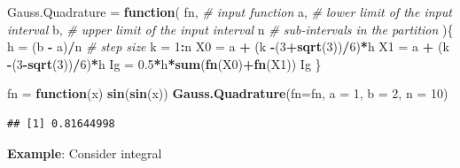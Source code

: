\documentclass[
]{book}
\newenvironment{Shaded}{\begin{snugshade}}{\end{snugshade}}
\newcommand{\AttributeTok}[1]{\textcolor[rgb]{0.13,0.29,0.53}{#1}}
\newcommand{\CommentTok}[1]{\textcolor[rgb]{0.56,0.35,0.01}{\textit{#1}}}
\newcommand{\ControlFlowTok}[1]{\textcolor[rgb]{0.13,0.29,0.53}{\textbf{#1}}}
\newcommand{\DecValTok}[1]{\textcolor[rgb]{0.00,0.00,0.81}{#1}}
\newcommand{\FloatTok}[1]{\textcolor[rgb]{0.00,0.00,0.81}{#1}}
\newcommand{\FunctionTok}[1]{\textcolor[rgb]{0.13,0.29,0.53}{\textbf{#1}}}
\newcommand{\NormalTok}[1]{#1}
\newcommand{\OtherTok}[1]{\textcolor[rgb]{0.56,0.35,0.01}{#1}}
\newcommand{\SpecialCharTok}[1]{\textcolor[rgb]{0.81,0.36,0.00}{\textbf{#1}}}
\begin{document}
\begin{Shaded}
\begin{Highlighting}[]
\NormalTok{Gauss.Quadrature }\OtherTok{=} \ControlFlowTok{function}\NormalTok{( fn,   }\CommentTok{\# input function}
\NormalTok{                             a,    }\CommentTok{\# lower limit of the input interval}
\NormalTok{                             b,    }\CommentTok{\# upper limit of the input interval}
\NormalTok{                             n     }\CommentTok{\# sub{-}intervals in the partition}
\NormalTok{                           )\{}
\NormalTok{    h }\OtherTok{=}\NormalTok{ (b }\SpecialCharTok{{-}}\NormalTok{ a)}\SpecialCharTok{/}\NormalTok{n                    }\CommentTok{\# step size}
\NormalTok{    k }\OtherTok{=} \DecValTok{1}\SpecialCharTok{:}\NormalTok{n}
\NormalTok{    X0 }\OtherTok{=}\NormalTok{ a }\SpecialCharTok{+}\NormalTok{ (k }\SpecialCharTok{{-}}\NormalTok{(}\DecValTok{3}\SpecialCharTok{+}\FunctionTok{sqrt}\NormalTok{(}\DecValTok{3}\NormalTok{))}\SpecialCharTok{/}\DecValTok{6}\NormalTok{)}\SpecialCharTok{*}\NormalTok{h}
\NormalTok{    X1 }\OtherTok{=}\NormalTok{ a }\SpecialCharTok{+}\NormalTok{ (k }\SpecialCharTok{{-}}\NormalTok{(}\DecValTok{3}\SpecialCharTok{{-}}\FunctionTok{sqrt}\NormalTok{(}\DecValTok{3}\NormalTok{))}\SpecialCharTok{/}\DecValTok{6}\NormalTok{)}\SpecialCharTok{*}\NormalTok{h}
\NormalTok{    Ig }\OtherTok{=} \FloatTok{0.5}\SpecialCharTok{*}\NormalTok{h}\SpecialCharTok{*}\FunctionTok{sum}\NormalTok{(}\FunctionTok{fn}\NormalTok{(X0)}\SpecialCharTok{+}\FunctionTok{fn}\NormalTok{(X1))}
\NormalTok{    Ig}
\NormalTok{\}}
\end{Highlighting}
\end{Shaded}

\begin{Shaded}
\begin{Highlighting}[]
\NormalTok{fn }\OtherTok{=} \ControlFlowTok{function}\NormalTok{(x) }\FunctionTok{sin}\NormalTok{(}\FunctionTok{sin}\NormalTok{(x))}
\FunctionTok{Gauss.Quadrature}\NormalTok{(}\AttributeTok{fn=}\NormalTok{fn, }\AttributeTok{a =} \DecValTok{1}\NormalTok{, }\AttributeTok{b =} \DecValTok{2}\NormalTok{, }\AttributeTok{n =} \DecValTok{10}\NormalTok{)}
\end{Highlighting}
\end{Shaded}

\begin{verbatim}
## [1] 0.81644998
\end{verbatim}

\textbf{Example}: Consider integral
\end{document}
